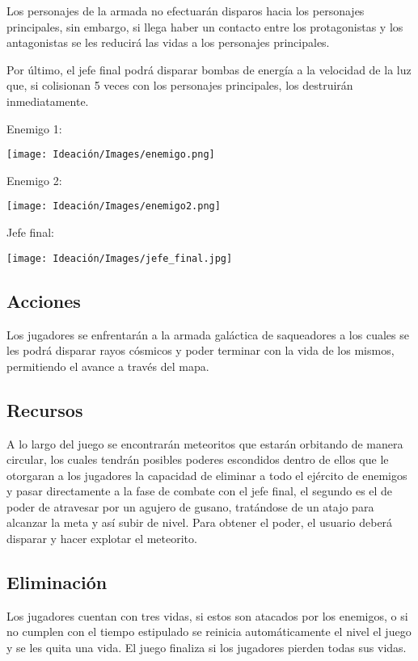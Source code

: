 \documentclass{article}
\begin{document}
Los personajes de la armada no efectuarán disparos hacia los personajes principales, sin embargo, si llega haber un contacto entre los protagonistas y los antagonistas se les reducirá las vidas a los personajes principales. 

Por último, el jefe final podrá disparar bombas de energía a la velocidad de la luz que, si colisionan 5 veces con los personajes principales, los destruirán inmediatamente. 

Enemigo 1: 


\texttt{[image: Ideación/Images/enemigo.png]}

Enemigo 2:

\texttt{[image: Ideación/Images/enemigo2.png]}

Jefe final: 



\texttt{[image: Ideación/Images/jefe\_final.jpg]}


\subsection{Acciones}
Los jugadores se enfrentarán a la armada galáctica de saqueadores a los cuales se les podrá disparar rayos cósmicos y poder terminar con la vida de los mismos, permitiendo el avance a través del mapa.

\subsection{Recursos}
A lo largo del juego se encontrarán meteoritos que estarán orbitando de manera circular, los cuales tendrán posibles poderes escondidos dentro de ellos que le otorgaran a los jugadores la capacidad de eliminar a todo el ejército de enemigos y pasar directamente a la fase de combate con el jefe final, el segundo es el de poder de atravesar por un agujero de gusano, tratándose de un atajo para alcanzar la meta y así subir de nivel. 
Para obtener el poder, el usuario deberá disparar y hacer explotar el meteorito.

\subsection{Eliminación}
Los jugadores cuentan con tres vidas, si estos son atacados por los enemigos, o si no cumplen con el tiempo estipulado se reinicia automáticamente el nivel el juego y se les quita una vida. El juego finaliza si los jugadores pierden todas sus vidas.
\end{document}

